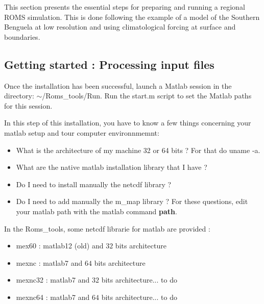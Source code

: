 This section presents the essential steps for preparing and running a regional ROMS
simulation. This is done following the example of a model of the Southern Benguela at
low resolution and using climatological forcing at surface and boundaries.
 
\subsection{Getting started : Processing input files}

Once the installation has been successful, launch a Matlab session in
the directory: $\sim$/Roms\_tools/Run. Run the start.m script to set
the Matlab paths for this session.


In this step of this installation, you have to know a few things concerning your
matlab setup and tour computer environnmemnt:
\begin{itemize}
\item What is the architecture of my machine 32 or 64 bits ? For that do uname -a.
\item What are the native matlab installation library that I have ?
\item Do I need to install manually the netcdf library ?
\item Do I need to add manually the m\_map library ? For these questions, edit your
  matlab path with the matlab command \textbf{path}. \\
\end{itemize}

In the Roms\_tools, some netcdf librarie for matlab are provided : 
\begin{itemize}
\item mex60 : matlab12 (old) and $32$ bits architecture
\item mexnc : matlab7 and $64$ bits architecture
\item mexnc32 : matlab7 and $32$ bits architecture... to do
\item mexnc64 : matlab7 and $64$ bits architecture... to do
\end{itemize}

